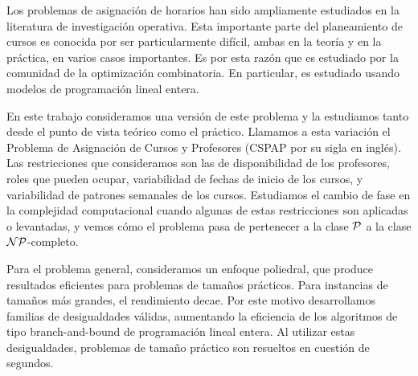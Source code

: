 Los problemas de asignación de horarios han sido ampliamente estudiados en la literatura de investigación operativa. Esta importante parte del planeamiento de cursos es conocida por ser particularmente difícil, ambas en la teoría y en la práctica, en varios casos importantes. Es por esta razón que es estudiado por la comunidad de la optimización combinatoria. En particular, es estudiado usando modelos de programación lineal entera.

En este trabajo consideramos una versión de este problema y la estudiamos tanto desde el punto de vista teórico como el práctico. Llamamos a esta variación el Problema de Asignación de Cursos y Profesores (CSPAP por su sigla en inglés). Las restricciones que consideramos son las de disponibilidad de los profesores, roles que pueden ocupar, variabilidad de fechas de inicio de los cursos, y variabilidad de patrones semanales de los cursos. Estudiamos el cambio de fase en la complejidad computacional cuando algunas de estas restricciones son aplicadas o levantadas, y vemos cómo el problema pasa de pertenecer a la clase $\mathcal{P}$ a la clase $\mathcal{NP}$-completo.

Para el problema general, consideramos un enfoque poliedral, que produce resultados eficientes para problemas de tamaños prácticos. Para instancias de tamaños más grandes, el rendimiento decae. Por este motivo desarrollamos familias de desigualdades válidas, aumentando la eficiencia de los algoritmos de tipo branch-and-bound de programación lineal entera. Al utilizar estas desigualdades, problemas de tamaño práctico son resueltos en cuestión de segundos.
